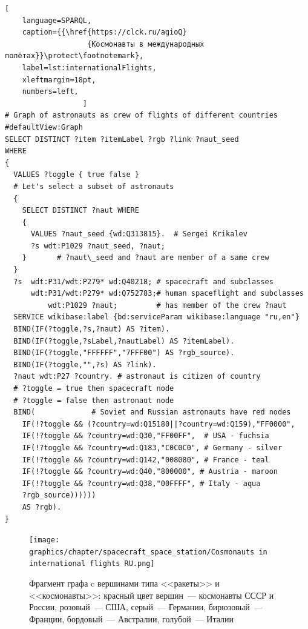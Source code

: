 \newpage
{}
%
\begin{lstlisting}[ 
    language=SPARQL, 
    caption={{\href{https://clck.ru/agioQ}
                   {Космонавты в международных полётах}}\protect\footnotemark}, 
    label=lst:internationalFlights,
    xleftmargin=18pt, 
    numbers=left,
                  ]
# Graph of astronauts as crew of flights of different countries
#defaultView:Graph
SELECT DISTINCT ?item ?itemLabel ?rgb ?link ?naut_seed
WHERE
{ 
  VALUES ?toggle { true false }
  # Let's select a subset of astronauts
  {
    SELECT DISTINCT ?naut WHERE
    { 
      VALUES ?naut_seed {wd:Q313815}.  # Sergei Krikalev
      ?s wdt:P1029 ?naut_seed, ?naut;  
    }       # ?naut\_seed and ?naut are member of a same crew
  }
  ?s  wdt:P31/wdt:P279* wd:Q40218; # spacecraft and subclasses
      wdt:P31/wdt:P279* wd:Q752783;# human spaceflight and subclasses
          wdt:P1029 ?naut;         # has member of the crew ?naut    
  SERVICE wikibase:label {bd:serviceParam wikibase:language "ru,en"}
  BIND(IF(?toggle,?s,?naut) AS ?item).
  BIND(IF(?toggle,?sLabel,?nautLabel) AS ?itemLabel).
  BIND(IF(?toggle,"FFFFFF","7FFF00") AS ?rgb_source).
  BIND(IF(?toggle,"",?s) AS ?link).
  ?naut wdt:P27 ?country. # astronaut is citizen of country 
  # ?toggle = true then spacecraft node
  # ?toggle = false then astronaut node
  BIND(             # Soviet and Russian astronauts have red nodes
    IF(!?toggle && (?country=wd:Q15180||?country=wd:Q159),"FF0000",
    IF(!?toggle && ?country=wd:Q30,"FF00FF",  # USA - fuchsia
    IF(!?toggle && ?country=wd:Q183,"C0C0C0", # Germany - silver
    IF(!?toggle && ?country=wd:Q142,"008080", # France - teal
    IF(!?toggle && ?country=wd:Q40,"800000", # Austria - maroon
    IF(!?toggle && ?country=wd:Q38,"00FFFF", # Italy - aqua
    ?rgb_source))))))
    AS ?rgb).
}
\end{lstlisting}





\begin{figure}[h]
\texttt{[image: graphics/chapter/spacecraft\_space\_station/Cosmonauts in international flights RU.png]}%
  \caption[Ракеты и космонавты на графе, 2022 год.]
          {Фрагмент графа c вершинами типа <<ракеты>> и <<космонавты>>: %
           красный цвет вершин~--- космонавты СССР и России, 
           розовый~--- США, 
           серый~--- Германии, 
           бирюзовый~--- Франции, 
           бордовый~--- Австралии, 
           голубой~--- Италии}
  \label{fig:internationalFlights}%
\end{figure}
